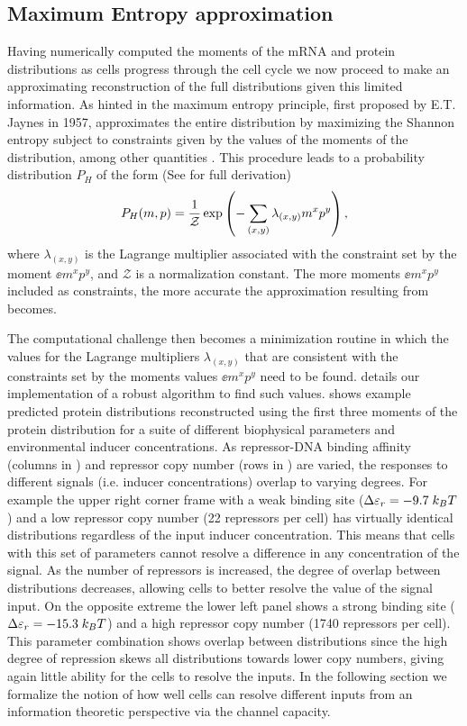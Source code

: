 \subsection{Maximum Entropy approximation}\label{sec_maxent}

Having numerically computed the moments of the mRNA and protein distributions as
cells progress through the cell cycle we now proceed to make an approximating
reconstruction of the full distributions given this limited information. As
hinted in  the maximum entropy principle, first proposed by
E.T. Jaynes in 1957, approximates the entire distribution by maximizing the
Shannon entropy subject to constraints given by the values of the moments of the
distribution, among other quantities \cite{Jaynes1957}. This procedure leads to
a probability distribution $P_H$ of the form (See  for full
derivation)
\begin{equation}
  P_H(m, p) = {1 \over \mathcal{Z}}
              \exp \left( - \sum_{(x,y)} \lambda_{(x,y)} m^x p^y \right),
  \label{eq_maxEnt_joint}
\end{equation}
where $\lambda_{(x,y)}$ is the Lagrange multiplier associated with the
constraint set by the moment $\ee{m^x p^y}$, and $\mathcal{Z}$ is a
normalization constant. The more moments $\ee{m^x p^y}$ included as constraints,
the more accurate the approximation resulting from 
becomes.

The computational challenge then becomes a minimization routine in which the
values for the Lagrange multipliers $\lambda_{(x,y)}$ that are consistent with
the constraints set by the moments values $\ee{m^x p^y}$ need to be found.
 details our implementation of a robust algorithm to find
such values.  shows example predicted protein distributions
reconstructed using the first three moments of the protein distribution for a
suite of different biophysical parameters and environmental inducer
concentrations. As repressor-DNA binding affinity (columns in
) and repressor copy number (rows in ) are
varied, the responses to different signals (i.e. inducer concentrations) overlap
to varying degrees. For example the upper right corner frame with a weak binding
site ($\Delta\varepsilon_r = -9.7 \; k_BT$) and a low repressor copy number (22 repressors per
cell) has virtually identical distributions regardless of the input inducer
concentration. This means that cells with this set of parameters cannot resolve
a difference in any concentration of the signal. As the number of repressors is
increased, the degree of overlap between distributions decreases, allowing cells
to better resolve the value of the signal input. On the opposite extreme the
lower left panel shows a strong binding site ($\Delta\varepsilon_r = -15.3 \; k_BT$) and a high
repressor copy number (1740 repressors per cell). This parameter combination
shows overlap between distributions since the high degree of repression skews
all distributions towards lower copy numbers, giving again little ability for
the cells to resolve the inputs. In the following section we formalize the
notion of how well cells can resolve different inputs from an information
theoretic perspective via the channel capacity.

